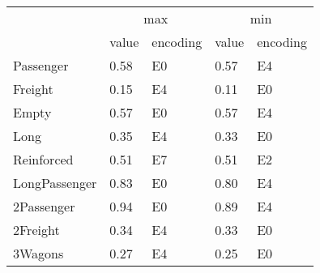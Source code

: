 \begin{tabular}{lllll}
\toprule
 & \multicolumn{2}{c}{max} & \multicolumn{2}{c}{min} \\
 & value & encoding & value & encoding \\
\midrule
Passenger & 0.58 & E0 & 0.57 & E4 \\
Freight & 0.15 & E4 & 0.11 & E0 \\
Empty & 0.57 & E0 & 0.57 & E4 \\
Long & 0.35 & E4 & 0.33 & E0 \\
Reinforced & 0.51 & E7 & 0.51 & E2 \\
LongPassenger & 0.83 & E0 & 0.80 & E4 \\
2Passenger & 0.94 & E0 & 0.89 & E4 \\
2Freight & 0.34 & E4 & 0.33 & E0 \\
3Wagons & 0.27 & E4 & 0.25 & E0 \\
\bottomrule
\end{tabular}
